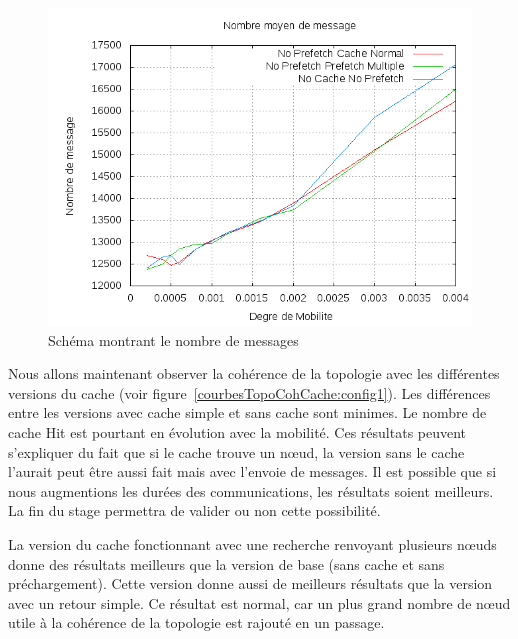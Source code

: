 	\begin{figure}[!h]
        \centering
        \includegraphics[scale=0.5]{../CacheCode/SolipsisPeersim/resultats/Courbes/Courbes_Final_Rapport/Nombre_Messages_Caches.png}
        \caption{Schéma montrant le nombre de messages}
        \label{courbesNbMessCache:config1}
        \end{figure}

Nous allons maintenant observer la cohérence de la topologie avec les différentes versions du cache (voir figure~\ref{courbesTopoCohCache:config1}). Les différences entre les versions avec cache simple et sans cache sont minimes. Le nombre de cache Hit est pourtant en évolution avec la mobilité. Ces résultats peuvent s'expliquer du fait que si le cache trouve un nœud, la version sans le cache l'aurait peut être aussi fait mais avec l'envoie de messages. Il est possible que si nous augmentions les durées des communications, les résultats soient meilleurs. La fin du stage permettra de valider ou non cette possibilité.
\par La version du cache fonctionnant avec une recherche renvoyant plusieurs nœuds donne des résultats meilleurs que la version de base (sans cache et sans préchargement). Cette version donne aussi de meilleurs résultats que la version avec un retour simple. Ce résultat est normal, car un plus grand nombre de nœud utile à la cohérence de la topologie est rajouté en un passage.

